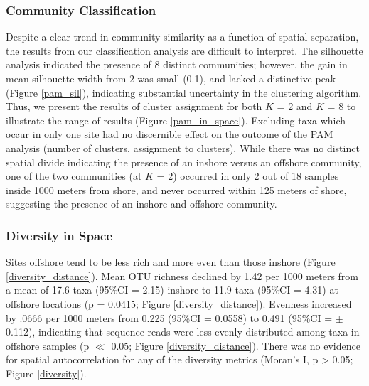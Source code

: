 \documentclass[11pt,letterpaper]{article} %
\begin{document}
\subsubsection*{Community Classification}
Despite a clear trend in community similarity as a function of spatial separation, the results from our classification analysis are difficult to interpret. The silhouette analysis indicated the presence of 8 distinct communities; however, the gain in mean silhouette width from 2 was small (0.1), and lacked a distinctive peak (Figure \ref{pam_sil}), indicating substantial uncertainty in the clustering algorithm. Thus, we present the results of cluster assignment for both $K$ = 2 and $K$ = 8 to illustrate the range of results (Figure \ref{pam_in_space}). Excluding taxa which occur in only one site had no discernible effect on the outcome of the PAM analysis (number of clusters, assignment to clusters). While there was no distinct spatial divide indicating the presence of an inshore versus an offshore community, one of the two communities (at $K$ = 2) occurred in only 2 out of 18 samples inside 1000 meters from shore, and never occurred within 125 meters of shore, suggesting the presence of an inshore and offshore community.

\subsubsection*{Diversity in Space}
Sites offshore tend to be less rich and more even than those inshore (Figure \ref{diversity_distance}). Mean OTU richness declined by 1.42 per 1000 meters from a mean of 17.6 taxa (95\%CI = 2.15) inshore to 11.9 taxa (95\%CI = 4.31) at offshore locations (p = 0.0415; Figure \ref{diversity_distance}). Evenness increased by .0666 per 1000 meters from 0.225 (95\%CI = 0.0558) to 0.491 (95\%CI = $\pm$ 0.112), indicating that sequence reads were less evenly distributed among taxa in offshore samples (p $\ll$ 0.05; Figure \ref{diversity_distance}). There was no evidence for spatial autocorrelation for any of the diversity metrics (Moran's I, p > 0.05; Figure \ref{diversity}).
\end{document}
